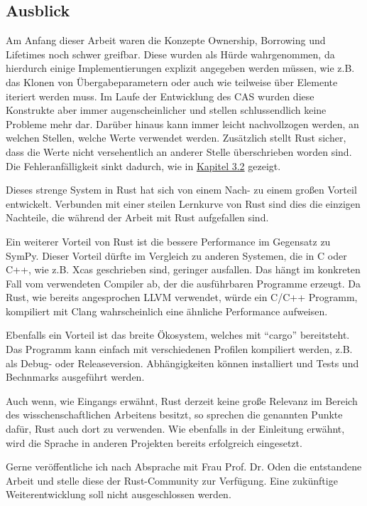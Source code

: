 \documentclass[11pt,a4paper, ngerman]{article}
\begin{document}
\subsection{Ausblick}
Am Anfang dieser Arbeit waren die Konzepte Ownership, Borrowing und Lifetimes noch schwer greifbar. Diese wurden als Hürde wahrgenommen, da hierdurch einige Implementierungen  explizit angegeben werden müssen, wie z.B. das Klonen von Übergabeparametern oder auch wie teilweise über Elemente iteriert werden muss. Im Laufe der Entwicklung des CAS wurden diese Konstrukte aber immer augenscheinlicher und stellen schlussendlich keine Probleme mehr dar. Darüber hinaus kann immer leicht nachvollzogen werden, an welchen Stellen, welche Werte verwendet werden. Zusätzlich stellt Rust sicher, dass die Werte nicht versehentlich an anderer Stelle überschrieben worden sind. Die Fehleranfälligkeit sinkt dadurch, wie in \hyperref[sec:kap3d2]{Kapitel 3.2} gezeigt.

Dieses strenge System in Rust hat sich von einem Nach- zu einem großen Vorteil entwickelt. Verbunden mit einer steilen Lernkurve von Rust sind dies die einzigen Nachteile, die während der Arbeit mit Rust aufgefallen sind.

Ein weiterer Vorteil von Rust ist die bessere Performance im Gegensatz zu SymPy. Dieser Vorteil dürfte im Vergleich zu anderen Systemen, die in C oder C++, wie z.B. Xcas \cite{XcasLink} geschrieben sind, geringer ausfallen. Das hängt im konkreten Fall vom verwendeten Compiler ab, der die ausführbaren Programme erzeugt. Da Rust, wie bereits angesprochen LLVM verwendet, würde ein C/C++ Programm, kompiliert mit Clang wahrscheinlich eine ähnliche Performance aufweisen.

Ebenfalls ein Vorteil ist das breite Ökosystem, welches mit ``cargo'' bereitsteht. Das Programm kann einfach mit verschiedenen Profilen kompiliert werden, z.B. als Debug- oder Releaseversion. Abhängigkeiten können installiert und Tests und Bechnmarks ausgeführt werden.

Auch wenn, wie Eingangs erwähnt, Rust derzeit keine große Relevanz im Bereich des wisschenschaftlichen Arbeitens besitzt, so sprechen die genannten Punkte dafür, Rust auch dort zu verwenden. Wie ebenfalls in der Einleitung erwähnt, wird die Sprache in anderen Projekten bereits erfolgreich eingesetzt.

Gerne veröffentliche ich nach Absprache mit Frau Prof. Dr. Oden die entstandene Arbeit und stelle diese der Rust-Community zur Verfügung. Eine zukünftige Weiterentwicklung soll nicht ausgeschlossen werden.

\newpage

\raggedright

\end{document}
